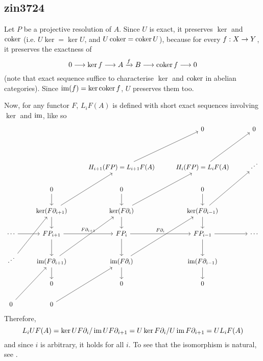 \subsection{zin3724}
Let $P$ be a projective resolution of $A$. Since $U$ is exact, it preserves $\ker$ and $\operatorname{\operatorname{coker}}$ (i.e. $U\ker=\ker U$, and $U\operatorname{\operatorname{coker}}=\operatorname{\operatorname{coker}} U$), because for every $f:X\rightarrow Y$, it preserves the exactness of
\[0\longrightarrow\ker f\longrightarrow A\xrightarrow{f}B\longrightarrow\operatorname{\operatorname{coker}} f\longrightarrow0\]
(note that exact sequence suffice to characterise $\ker$ and $\operatorname{\operatorname{coker}}$ in abelian categories). Since $\operatorname{\operatorname{im}}(f)=\ker\operatorname{\operatorname{coker}} f$, $U$ preserves them too.

Now, for any functor $F$, $L_iF(A)$ is defined with short exact sequences involving $\ker$ and $\operatorname{\operatorname{im}}$, like so
\[
    \begin{tikzcd}
        &                                                          &                                                      & 0                                            & 0       \\
        &                                                          &                                                      &                                              &         \\
        &                                                          & H_{i+1}(FP)=L_{i+1}F(A) \arrow[ruu]                  & H_i(FP)=L_iF(A) \arrow[ruu]                  & \iddots \\
        & 0 \arrow[d]                                              & 0 \arrow[d]                                          & 0 \arrow[d]                                  &         \\
        & \ker(F\partial_{i+1}) \arrow[d] \arrow[ruu]              & \ker(F\partial_i) \arrow[d] \arrow[ruu]              & \ker(F\partial_{i-1}) \arrow[d] \arrow[ruu]  &         \\
\cdots \arrow[r]    & FP_{i+1} \arrow[r, "F\partial_{i+1}"] \arrow[d]          & FP_i \arrow[r, "F\partial_i"] \arrow[d]              & FP_{i-1} \arrow[r] \arrow[d]                 & \cdots  \\
\iddots \arrow[ruu] & \operatorname{im}(F\partial_{i+1}) \arrow[d] \arrow[ruu] & \operatorname{im}(F\partial_i) \arrow[d] \arrow[ruu] & \operatorname{im}(F\partial_{i-1}) \arrow[d] &         \\
        & 0                                                        & 0                                                    & 0                                            &         \\
0 \arrow[ruu]       & 0 \arrow[ruu]                                            &                                                      &                                              &        
\end{tikzcd}
\]
Therefore,
\[L_iUF(A)=\ker{UF\partial_i}/\operatorname{\operatorname{im}}{UF\partial_{i+1}}=U\ker{F\partial_i}/U\operatorname{\operatorname{im}}{F\partial_{i+1}}=UL_iF(A)\]
and since $i$ is arbitrary, it holds for all $i$. To see that the isomorphism is natural, see \cite{Pedro_2018}.